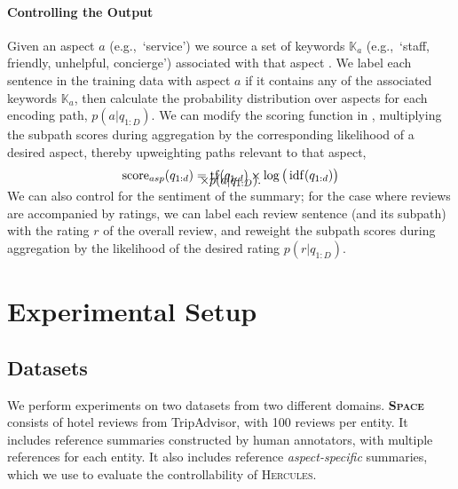 \documentclass[11pt]{article}
\DeclareMathOperator*{\tf}{tf}
\DeclareMathOperator*{\idf}{idf}
\begin{document}
\paragraph{Controlling the Output} Given an aspect $a$ (e.g.,~`service') we source a set of keywords $\mathbb{K}_a$ (e.g.,~`staff, friendly, unhelpful, concierge') associated with that aspect \cite{angelidis-etal-2021-extractive}. We label each sentence in the training data with aspect $a$ if it contains any of the associated keywords $\mathbb{K}_a$, then calculate the probability distribution over aspects for each encoding path, $p(a|q_{1:D})$. We can modify the scoring function in , multiplying the subpath scores during aggregation by the corresponding likelihood of a desired aspect, thereby upweighting paths relevant to that aspect,
\begin{multline}
\vspace{-.4cm}
    \text{score}_{asp}(q_{1:d}) = \tf(q_{1:d}) \times \log\big(\idf(q_{1:d})\big) \\ \times p(a|q_{1:D}).
    \vspace{-.4cm}
\end{multline}

We can also control for the sentiment of the summary; for the case where reviews are accompanied by ratings, we can label each review sentence (and its subpath) with the rating $r$ of the overall review, and reweight the subpath scores during aggregation by the likelihood of the desired rating $p(r|q_{1:D})$.






\section{Experimental Setup}
\label{sec:experiments}

\subsection{Datasets}
\label{sec:datasets}

We perform experiments on two datasets from two different domains. \textsc{\textbf{Space}} \cite{angelidis-etal-2021-extractive} consists of hotel reviews from TripAdvisor, with 100 reviews per entity. It includes reference summaries constructed by human annotators, with multiple references for each entity. It also includes reference \textit{aspect-specific} summaries, which we use to evaluate the controllability of \textsc{Hercules}.
\end{document}
